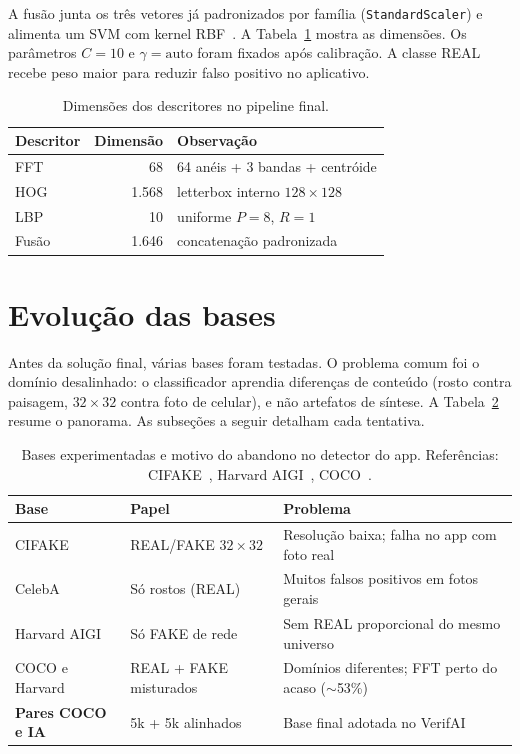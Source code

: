 \documentclass[12pt]{article}
\begin{document}
A fusão junta os três vetores já padronizados por família (\texttt{StandardScaler}) e alimenta um SVM com kernel RBF~\cite{cortes1995svm}. A Tabela~\ref{tab:dims} mostra as dimensões. Os parâmetros $C{=}10$ e $\gamma{=}\mathrm{auto}$ foram fixados após calibração. A classe REAL recebe peso maior para reduzir falso positivo no aplicativo.

\begin{table}[ht]
\centering
\small
\caption{Dimensões dos descritores no pipeline final.}
\label{tab:dims}
\begin{tabular}{lrl}
\toprule
Descritor & Dimensão & Observação \\
\midrule
FFT   & 68    & 64 anéis + 3 bandas + centróide \\
HOG   & 1{.}568 & letterbox interno $128{\times}128$ \\
LBP   & 10    & uniforme $P{=}8$, $R{=}1$ \\
Fusão & 1{.}646 & concatenação padronizada \\
\bottomrule
\end{tabular}
\end{table}

\section{Evolução das bases}
\label{sec:bases}

Antes da solução final, várias bases foram testadas. O problema comum foi o domínio desalinhado: o classificador aprendia diferenças de conteúdo (rosto contra paisagem, $32{\times}32$ contra foto de celular), e não artefatos de síntese. A Tabela~\ref{tab:bases} resume o panorama. As subseções a seguir detalham cada tentativa.

\begin{table}[ht]
\centering
\small
\caption{Bases experimentadas e motivo do abandono no detector do app.
Referências: CIFAKE~\cite{bird2024cifake}, Harvard AIGI~\cite{harvardAIGI}, COCO~\cite{coco2017}.}
\label{tab:bases}
\renewcommand{\arraystretch}{1.25}
\begin{tabular}{@{}p{2.8cm}p{3.6cm}p{6.0cm}@{}}
\toprule
\textbf{Base} & \textbf{Papel} & \textbf{Problema} \\
\midrule
CIFAKE
  & REAL/FAKE $32{\times}32$
  & Resolução baixa; falha no app com foto real \\
CelebA
  & Só rostos (REAL)
  & Muitos falsos positivos em fotos gerais \\
Harvard AIGI
  & Só FAKE de rede
  & Sem REAL proporcional do mesmo universo \\
COCO e Harvard
  & REAL + FAKE misturados
  & Domínios diferentes; FFT perto do acaso ($\sim$53\%) \\
\textbf{Pares COCO e IA}
  & 5k + 5k alinhados
  & Base final adotada no VerifAI \\
\bottomrule
\end{tabular}
\end{table}
\end{document}
